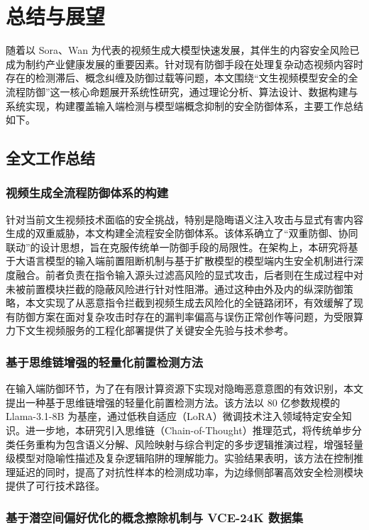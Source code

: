 \chapter{总结与展望}

随着以 Sora、Wan 为代表的视频生成大模型快速发展，其伴生的内容安全风险已成为制约产业健康发展的重要因素。针对现有防御手段在处理复杂动态视频内容时存在的检测滞后、概念纠缠及防御过载等问题，本文围绕“文生视频模型安全的全流程防御”这一核心命题展开系统性研究，通过理论分析、算法设计、数据构建与系统实现，构建覆盖输入端检测与模型端概念抑制的安全防御体系，主要工作总结如下。

\section{全文工作总结}
\subsection{视频生成全流程防御体系的构建}

针对当前文生视频技术面临的安全挑战，特别是隐晦语义注入攻击与显式有害内容生成的双重威胁，本文构建全流程安全防御体系。该体系确立了“双重防御、协同联动”的设计思想，旨在克服传统单一防御手段的局限性。在架构上，本研究将基于大语言模型的输入端前置阻断机制与基于扩散模型的模型端内生安全机制进行深度融合。前者负责在指令输入源头过滤高风险的显式攻击，后者则在生成过程中对未被前置模块拦截的隐蔽风险进行针对性阻滞。通过这种由外及内的纵深防御策略，本文实现了从恶意指令拦截到视频生成去风险化的全链路闭环，有效缓解了现有防御方案在面对复杂攻击时存在的漏判率偏高与误伤正常创作等问题，为受限算力下文生视频服务的工程化部署提供了关键安全先验与技术参考。

\subsection{基于思维链增强的轻量化前置检测方法}

在输入端防御环节，为了在有限计算资源下实现对隐晦恶意意图的有效识别，本文提出一种基于思维链增强的轻量化前置检测方法。该方法以 80 亿参数规模的 Llama-3.1-8B 为基座，通过低秩自适应（LoRA）微调技术注入领域特定安全知识。进一步地，本研究引入思维链（Chain-of-Thought）推理范式，将传统单步分类任务重构为包含语义分解、风险映射与综合判定的多步逻辑推演过程，增强轻量级模型对隐喻性描述及复杂逻辑陷阱的理解能力。实验结果表明，该方法在控制推理延迟的同时，提高了对抗性样本的检测成功率，为边缘侧部署高效安全检测模块提供了可行技术路径。

\subsection{基于潜空间偏好优化的概念擦除机制与 VCE-24K 数据集}

